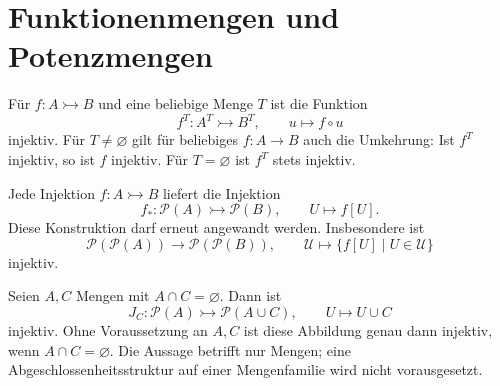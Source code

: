 \section{Funktionenmengen und Potenzmengen}

\begin{theorem}
\label{b06guide:thm:functionsets}
Für $f\colon A\rightarrowtail B$ und eine beliebige Menge $T$
ist die Funktion
\[
 f^T\colon A^T\rightarrowtail B^T,\qquad u\mapsto f\circ u
\]
injektiv. Für $T\ne\varnothing$ gilt für beliebiges $f\colon A\to B$
auch die Umkehrung: Ist $f^T$ injektiv, so ist $f$ injektiv.
Für $T=\varnothing$ ist $f^T$ stets injektiv.
\end{theorem}

\begin{theorem}
\label{b06guide:thm:powersetinjection}
Jede Injektion $f\colon A\rightarrowtail B$ liefert die Injektion
\[
 f_*\colon\mathcal P(A)\rightarrowtail\mathcal P(B),\qquad
 U\mapsto f[U].
\]
Diese Konstruktion darf erneut angewandt werden. Insbesondere ist
\[
 \mathcal P(\mathcal P(A))
   \longrightarrow\mathcal P(\mathcal P(B)),\qquad
 \mathcal U\longmapsto\{f[U]\mid U\in\mathcal U\}
\]
injektiv.
\end{theorem}

\begin{theorem}
\label{b06guide:thm:adjunction}
Seien $A,C$ Mengen mit $A\cap C=\varnothing$.
Dann ist
\[
 J_C\colon\mathcal P(A)\rightarrowtail\mathcal P(A\cup C),
 \qquad U\mapsto U\cup C
\]
injektiv. Ohne Voraussetzung an $A,C$ ist diese Abbildung
genau dann injektiv, wenn $A\cap C=\varnothing$.
Die Aussage betrifft nur Mengen; eine Abgeschlossenheitsstruktur
auf einer Mengenfamilie wird nicht vorausgesetzt.
\end{theorem}
